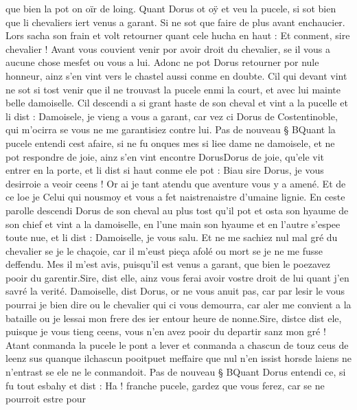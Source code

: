 \documentclass{article}
\begin{document}
\begin{pages}
   que bien la pot on oïr de loing. \pend
\pstart Quant Dorus 
   ot oÿ et veu 
   la pucele, si sot bien que 
   li chevaliers iert venus a garant. 
   Si ne sot que faire de plus avant enchaucier. Lors sacha son frain et volt retourner quant cele hucha en haut :
   Et conment, sire chevalier ! Avant vous couvient venir por avoir droit du 
      chevalier, se il vous a aucune chose mesfet ou vous a lui.
   Adonc ne pot Dorus retourner por nule honneur, ainz s’en vint vers 
   le chastel aussi conme en doubte. 
   Cil qui devant vint ne sot si tost venir 
   que il ne trouvast la pucele enmi la court, et avec lui mainte belle damoiselle. 
   Cil descendi a si grant haste de son cheval et vint a la pucelle et li dist :
   Damoisele, je vieng a vous a garant, car vez ci Dorus de 
      Costentinoble, qui m’ocirra se vous ne me garantisiez contre lui. \pend
\pstart Pas de nouveau § BQuant 
   la pucele entendi cest afaire, 
   si ne fu onques mes si liee dame ne damoisele, et ne pot respondre de joie, ainz s’en vint encontre 
   DorusDorus de joie, qu’ele vit entrer 
   en la porte, et li dist si haut conme ele pot :
   Biau sire Dorus, je vous desirroie a veoir ceens ! 
      Or ai je tant atendu que aventure vous y a amené. Et de ce loe je Celui qui 
      nousmoy et vous a fet 
      naistrenaistre d'umaine lignie.
   En ceste parolle descendi Dorus de son cheval au plus tost qu’il pot 
   et osta son hyaume de son chief et vint a la damoiselle, en l’une main son hyaume 
   et en l’autre s’espee toute nue, et li dist :
   Damoiselle, je vous salu. Et ne me sachiez nul mal gré du 
      chevalier se je le chaçoie, 
   car il m’eust pieça afolé ou mort se je ne me fusse deffendu. Mes il m’est avis, puisqu’il est venus a garant, 
   que bien le poezavez pooir du 
   garentir.Sire, dist elle, ainz vous ferai avoir vostre droit de lui quant j’en savré la verité. \pend
\pstart Damoiselle, dist Dorus, 
   or ne vous anuit pas, car par lesir le vous pourrai je bien dire ou le chevalier 
   qui ci vous demourra, 
   car aler me convient a la bataille ou je lessai mon frere des ier entour heure de nonne.Sire, distce dist ele, puisque je vous tieng ceens,
      vous n’en avez pooir du departir sanz mon gré !
   Atant conmanda la pucele le pont a lever et conmanda 
   a chascun de touz ceus de leenz 
   sus quanque ilchascun pooitpuet 
   meffaire que nul n’en issist 
   horsde laiens ne 
   n’entrast se ele ne le conmandoit. \pend
\pstart Pas de nouveau § BQuant Dorus entendi ce, 
   si fu tout esbahy et dist :
   Ha ! franche pucele, gardez que vous ferez, car se ne pourroit estre pour 

\end{pages}
\end{document}
